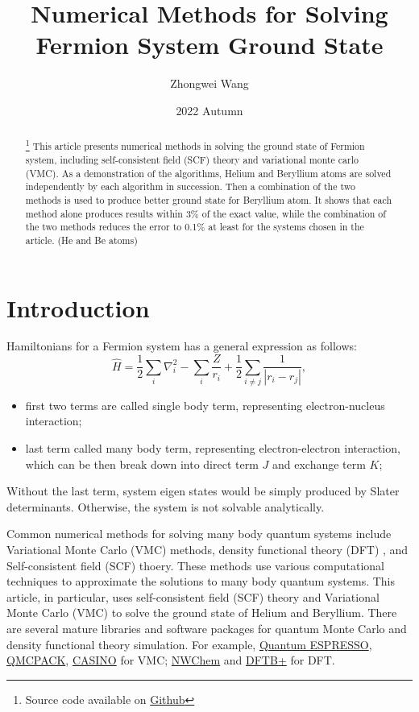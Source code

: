 \documentclass[11pt]{article}
\title{Numerical Methods for Solving Fermion System Ground State}
\author{Zhongwei Wang}
\date{2022 Autumn}
\begin{document}
\maketitle

\begin{abstract}\footnote[1]{Source code available on \href{https://github.com/Wang-Zhongwei/Many-body-ground-state-energy-by-VMC-and-SCF/tree/main}{Github}}
This article presents numerical methods in solving the ground state of Fermion system, including self-consistent field (SCF) theory and variational monte carlo (VMC). 
As a demonstration of the algorithms, Helium and Beryllium atoms are solved independently by each algorithm in succession. 
Then a combination of the two methods is used to produce better ground state for Beryllium atom. 
It shows that each method alone produces results within 3\% of the exact value, while the combination of the two methods reduces the error to 0.1\% at least for the systems chosen in the article. (He and Be atoms)
\end{abstract}

\section{Introduction}\label{section-introduction}
Hamiltonians for a Fermion system has a general expression as follows:
\begin{equation}\label{eq:hamiltonian}
\hat{H} = \frac{1}{2}\sum_{i}\nabla_i^2  - \sum_i \frac{Z}{r_i} + \frac{1}{2}\sum_{i \neq j} \frac{1}{|r_i-r_j|},
\end{equation}
\begin{itemize}
    \item first two terms are called single body term, representing electron-nucleus interaction;
    \item last term called many body term, representing electron-electron interaction, which can be then break down into 
    direct term $J$ and exchange term $K$; 
\end{itemize}
Without the last term, system eigen states would be simply produced by Slater determinants. Otherwise, the system is not solvable analytically.

Common numerical methods for solving many body quantum systems include Variational Monte Carlo (VMC) \cite{First_VMC} methods, density functional theory (DFT) \cite{First-DFT}, and Self-consistent field (SCF) \cite{Early-SCF} thoery. 
These methods use various computational techniques to approximate the solutions to many body quantum systems. This article, in particular, uses self-consistent field (SCF) theory and Variational Monte Carlo (VMC) to solve the ground state of Helium and Beryllium. 
There are several mature libraries and software packages for quantum Monte Carlo and density functional theory simulation. For example, \href{https://www.quantum-espresso.org/}{Quantum ESPRESSO}, \href{https://qmcpack.org/}{QMCPACK}, \href{https://vallico.net/casinoqmc/}{CASINO} for VMC; \href{https://www.nwchem-sw.org/}{NWChem} and \href{https://dftbplus.org/}{DFTB+} for DFT. 
\end{document}
